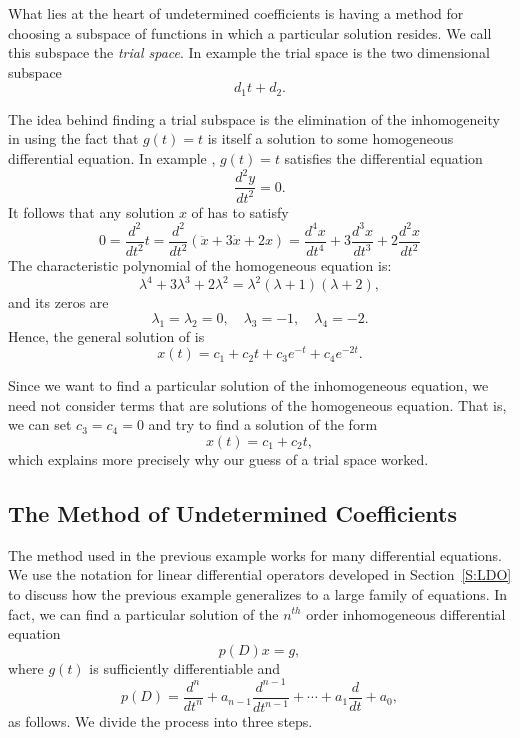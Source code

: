 \documentclass{ximera}
\begin{document}
What lies at the heart of undetermined coefficients is having a method 
for choosing a subspace of functions in which a particular solution resides.  
We call this subspace the {\em trial space}.  In example 
 the trial space is the two dimensional subspace
\[
d_1t + d_2.
\]

The idea behind finding a trial subspace is the elimination of the 
inhomogeneity in  using the fact that $g(t)=t$ is 
itself a solution to some homogeneous differential equation.  In example 
, $g(t)=t$ satisfies the differential equation
\[
\frac{d^2y}{dt^2} = 0.
\]
It follows that any solution $x$ of  has to satisfy
\begin{equation}  \label{e:undetc2}
0 = \frac{d^2}{dt^2}t=\frac{d^2}{dt^2}(\ddot{x} + 3\dot{x}+2x) = 
\frac{d^4x}{dt^4} + 3\frac{d^3x}{dt^3} + 2\frac{d^2x}{dt^2}
\end{equation}
The characteristic 
polynomial
of the homogeneous equation 
 is: 
\[
\lambda^4 + 3\lambda^3 + 2\lambda^2 = \lambda^2(\lambda+1)(\lambda+2),
\]
and its zeros are
\[
\lambda_1=\lambda_2=0,\quad \lambda_3=-1,\quad \lambda_4 = -2.
\]
Hence, the general solution of  is
\[
x(t) = c_1 + c_2 t + c_3 e^{-t} + c_4 e^{-2t}.
\]

Since we want to find a particular solution 
of the inhomogeneous equation, 
we need not consider terms that are solutions of the homogeneous equation. 
That is, we can set $c_3=c_4=0$ and try to find a solution of the form
\[
x(t) = c_1 + c_2 t,
\]
which explains more precisely why our guess of a trial space worked.


\subsection*{The Method of Undetermined Coefficients}

The method used in the previous example works for many differential 
equations.  We use the notation for 
linear differential operators 
developed in Section~\ref{S:LDO} to discuss how the previous example 
generalizes to a large family of equations.  In fact, we can find a 
particular solution of the $n^{th}$ order inhomogeneous differential equation 
\begin{equation}  \label{eq:nconst2}
p(D)x = g,
\end{equation}
where $g(t)$ is sufficiently differentiable and 
\[
p(D) = \frac{d^n}{dt^n} + a_{n-1}\frac{d^{n-1}}{dt^{n-1}} + \cdots + 
a_1\frac{d}{dt}+a_0,
\]
as follows.  We divide the process into three steps.
\end{document}
